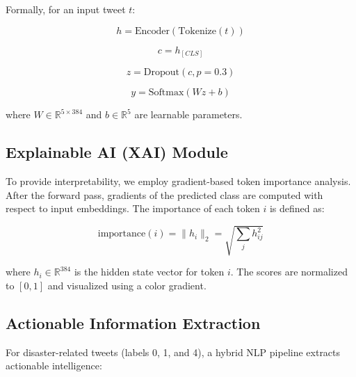 \documentclass[pdflatex,sn-mathphys-num]{sn-jnl}%
\theoremstyle{thmstyleone}%
\theoremstyle{thmstyletwo}%
\theoremstyle{thmstylethree}%
\begin{document}
Formally, for an input tweet $t$:

\begin{equation}
h = \text{Encoder}(\text{Tokenize}(t))
\end{equation}

\begin{equation}
c = h_{[CLS]}
\end{equation}

\begin{equation}
z = \text{Dropout}(c, p=0.3)
\end{equation}

\begin{equation}
y = \text{Softmax}(Wz + b)
\end{equation}

where $W \in \mathbb{R}^{5 \times 384}$ and $b \in \mathbb{R}^{5}$ are learnable parameters.

\subsection{Explainable AI (XAI) Module}

To provide interpretability, we employ gradient-based token importance analysis. After the forward pass, gradients of the predicted class are computed with respect to input embeddings. The importance of each token $i$ is defined as:

\begin{equation}
\text{importance}(i) = \|h_i\|_2 = \sqrt{\sum_j h_{ij}^2}
\end{equation}

where $h_i \in \mathbb{R}^{384}$ is the hidden state vector for token $i$. The scores are normalized to $[0,1]$ and visualized using a color gradient.

\subsection{Actionable Information Extraction}

For disaster-related tweets (labels 0, 1, and 4), a hybrid NLP pipeline extracts actionable intelligence:
\end{document}
